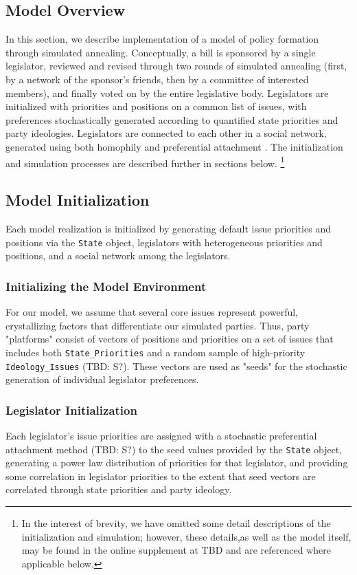 \documentclass[pdftex,12pt]{llncs}
\begin{document}
\subsection{Model Overview}
In this section, we describe implementation of a model of policy formation through simulated annealing.
Conceptually, a bill is sponsored by a single legislator, reviewed and revised through two rounds of simulated annealing (first, by a network of the sponsor's friends, then by a committee of interested members), and finally voted on by the entire legislative body.
Legislators are initialized with priorities and positions on a common list of issues, with preferences stochastically generated according to quantified state priorities and party ideologies.
Legislators are connected to each other in a social network, generated using both homophily \parencite{msc01, br11} and preferential attachment \parencite{Barabasi1999}.
The initialization and simulation processes are described further in sections below.
\footnote{In the interest of brevity, we have omitted some detail descriptions of the initialization and simulation; however, these details,as well as the model itself, may be found in the online supplement at TBD and are referenced where applicable below.}
\subsection{Model Initialization}
Each model realization is initialized by generating default issue priorities and positions via the \texttt{State} object, legislators with heterogeneous priorities and positions, and a social network among the legislators.
\subsubsection{Initializing the Model Environment}
For our model, we assume that several core issues represent powerful, crystallizing factors that differentiate our simulated parties.
Thus, party "platforms" consist of vectors of positions and priorities on a set of issues that includes both \texttt{State\_Priorities} and a random sample of high-priority \texttt{Ideology\_Issues} (TBD: S?).
These vectors are used as "seeds" for the stochastic generation of individual legislator preferences.
\subsubsection{Legislator Initialization}
Each legislator's issue priorities are assigned with a stochastic preferential attachment method (TBD: S?) to the seed values provided by the \texttt{State} object, generating a power law distribution of priorities for that legislator, and providing some correlation in legislator priorities to the extent that seed vectors are correlated through state priorities and party ideology.
\end{document}
